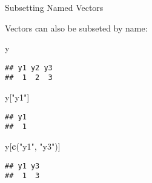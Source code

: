 \documentclass[ignorenonframetext,]{beamer}
\newenvironment{Shaded}{\begin{snugshade}}{\end{snugshade}}
\newcommand{\KeywordTok}[1]{\textcolor[rgb]{0.13,0.29,0.53}{\textbf{#1}}}
\newcommand{\NormalTok}[1]{#1}
\newcommand{\StringTok}[1]{\textcolor[rgb]{0.31,0.60,0.02}{#1}}
\begin{document}
\begin{frame}[fragile]{Subsetting Named Vectors}
\protect\hypertarget{subsetting-named-vectors}{}

Vectors can also be subseted by name:

\begin{Shaded}
\begin{Highlighting}[]
\NormalTok{y}
\end{Highlighting}
\end{Shaded}

\begin{verbatim}
## y1 y2 y3 
##  1  2  3
\end{verbatim}

\begin{Shaded}
\begin{Highlighting}[]
\NormalTok{y[}\StringTok{"y1"}\NormalTok{]}
\end{Highlighting}
\end{Shaded}

\begin{verbatim}
## y1 
##  1
\end{verbatim}

\begin{Shaded}
\begin{Highlighting}[]
\NormalTok{y[}\KeywordTok{c}\NormalTok{(}\StringTok{"y1"}\NormalTok{, }\StringTok{"y3"}\NormalTok{)]}
\end{Highlighting}
\end{Shaded}

\begin{verbatim}
## y1 y3 
##  1  3
\end{verbatim}

\end{frame}
\end{document}
